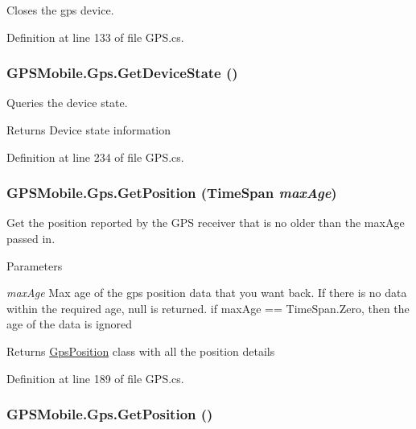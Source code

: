 Closes the gps device. 

Definition at line 133 of file GPS.cs.\hypertarget{class_g_p_s_mobile_1_1_gps_aeff3c031b36f7322c81050480351f667}{
\subsubsection[{GetDeviceState}]{ GPSMobile.Gps.GetDeviceState ()}}
\label{class_g_p_s_mobile_1_1_gps_aeff3c031b36f7322c81050480351f667}


Queries the device state. \begin{DoxyReturn}{Returns}
Device state information
\end{DoxyReturn}


Definition at line 234 of file GPS.cs.\hypertarget{class_g_p_s_mobile_1_1_gps_ac984add12f07f111aa65d115251d9f89}{
\subsubsection[{GetPosition}]{ GPSMobile.Gps.GetPosition (TimeSpan {\em maxAge})}}
\label{class_g_p_s_mobile_1_1_gps_ac984add12f07f111aa65d115251d9f89}


Get the position reported by the GPS receiver that is no older than the maxAge passed in. 
\begin{DoxyParams}{Parameters}
\item[{\em maxAge}]Max age of the gps position data that you want back. If there is no data within the required age, null is returned. if maxAge == TimeSpan.Zero, then the age of the data is ignored\end{DoxyParams}
\begin{DoxyReturn}{Returns}
\hyperlink{class_g_p_s_mobile_1_1_gps_position}{GpsPosition} class with all the position details
\end{DoxyReturn}


Definition at line 189 of file GPS.cs.\hypertarget{class_g_p_s_mobile_1_1_gps_a649e743e090756fd725666cfc3daf4fa}{
\subsubsection[{GetPosition}]{ GPSMobile.Gps.GetPosition ()}}
\label{class_g_p_s_mobile_1_1_gps_a649e743e090756fd725666cfc3daf4fa}


